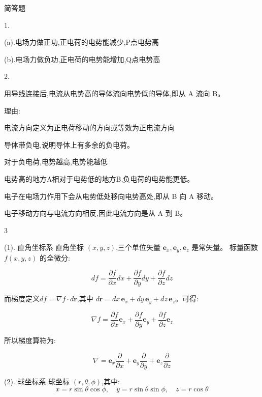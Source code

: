 \documentclass{article}
\begin{document}
简答题

1.


(a).电场力做正功,正电荷的电势能减少,P点电势高

(b).电场力做负功,正电荷的电势能增加,Q点电势高



\vspace{4em}
2.


用导线连接后,电流从电势高的导体流向电势低的导体,即从 A 流向 B。  

理由: 

电流方向定义为正电荷移动的方向或等效为正电流方向

导体带负电,说明导体上有多余的负电荷。  

对于负电荷,电势越高,电势能越低

电势高的地方A相对于电势低的地方B,负电荷的电势能更低。  

电子在电场力作用下会从电势低处移向电势高处,即从 B 向 A 移动。

电子移动方向与电流方向相反,因此电流方向是从 A 到 B。  




\newpage

3



 (1). 直角坐标系  
直角坐标 $(x, y, z)$,三个单位矢量 $\mathbf{e}_x, \mathbf{e}_y, \mathbf{e}_z$ 是常矢量。  
标量函数 $f(x, y, z)$ 的全微分:  

$$df = \frac{\partial f}{\partial x} dx + \frac{\partial f}{\partial y} dy + \frac{\partial f}{\partial z} dz$$  

而梯度定义$df = \nabla f \cdot d\mathbf{r}$,其中 $d\mathbf{r} = dx\,\mathbf{e}_x + dy\,\mathbf{e}_y + dz\,\mathbf{e}_z$。可得:  

$$\nabla f = \frac{\partial f}{\partial x} \mathbf{e}_x + \frac{\partial f}{\partial y} \mathbf{e}_y + \frac{\partial f}{\partial z} \mathbf{e}_z$$  

所以梯度算符为:  

$$\nabla = \mathbf{e}_x \frac{\partial}{\partial x} + \mathbf{e}_y \frac{\partial}{\partial y} + \mathbf{e}_z \frac{\partial}{\partial z}$$  



 (2). 球坐标系  
球坐标 $(r, \theta, \phi)$,其中:  
$$x = r \sin\theta \cos\phi, \quad y = r \sin\theta \sin\phi, \quad z = r \cos\theta$$  
\end{document}

